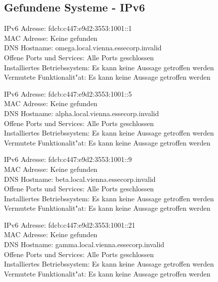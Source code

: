 \documentclass[12pt,a4paper,titlepage,oneside]{scrartcl}
\begin{document}
\subsection{Gefundene Systeme - IPv6}
\begin{description}
\item
IPv6 Adresse: fdcb:c447:e9d2:3553:1001::1\\
MAC Adresse: Keine gefunden\\
DNS Hostname: omega.local.vienna.essecorp.invalid\\
Offene Ports und Services: Alle Ports geschlossen\\
Installiertes Betriebssystem: Es kann keine Aussage getroffen werden\\
Vermutete Funktionalit"at: Es kann keine Aussage getroffen werden\\
\item
IPv6 Adresse: fdcb:c447:e9d2:3553:1001::5\\
MAC Adresse: Keine gefunden\\
DNS Hostname: alpha.local.vienna.essecorp.invalid\\
Offene Ports und Services: Alle Ports geschlossen\\
Installiertes Betriebssystem: Es kann keine Aussage getroffen werden\\
Vermutete Funktionalit"at: Es kann keine Aussage getroffen werden\\
\item
IPv6 Adresse: fdcb:c447:e9d2:3553:1001::9\\
MAC Adresse: Keine gefunden\\
DNS Hostname: beta.local.vienna.essecorp.invalid\\
Offene Ports und Services: Alle Ports geschlossen\\
Installiertes Betriebssystem: Es kann keine Aussage getroffen werden\\
Vermutete Funktionalit"at: Es kann keine Aussage getroffen werden\\
\item
IPv6 Adresse: fdcb:c447:e9d2:3553:1001::21\\
MAC Adresse: Keine gefunden\\
DNS Hostname: gamma.local.vienna.essecorp.invalid\\
Offene Ports und Services: Alle Ports geschlossen\\
Installiertes Betriebssystem: Es kann keine Aussage getroffen werden\\
Vermutete Funktionalit"at: Es kann keine Aussage getroffen werden\\

\end{description}
\end{document}
